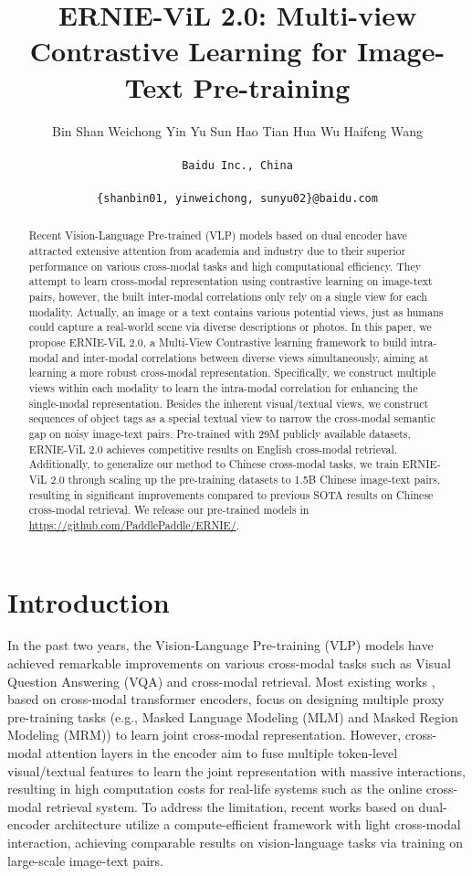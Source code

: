\documentclass{article}
\title{ERNIE-ViL 2.0: Multi-view Contrastive Learning for Image-Text Pre-training}
\author{
     Bin Shan
\hspace{1cm} Weichong Yin
\hspace{1cm} Yu Sun 
\hspace{1cm} Hao Tian  
\hspace{1cm} Hua Wu
\hspace{1cm} Haifeng Wang
\\\\\texttt{Baidu Inc., China}
\\\\
\texttt{\{shanbin01, yinweichong, sunyu02\}@baidu.com} 
}
\begin{document}
\maketitle
\begin{abstract}
Recent Vision-Language Pre-trained (VLP) models based on dual encoder have attracted extensive attention from academia and industry due to their superior performance on various cross-modal tasks and high computational efficiency. They attempt to learn cross-modal representation using contrastive learning on image-text pairs, however, the built inter-modal correlations only rely on a single view for each modality.
Actually, an image or a text contains various potential views, just as humans could capture a real-world scene via diverse descriptions or photos. In this paper, we propose ERNIE-ViL 2.0, a Multi-View Contrastive learning framework to build intra-modal and inter-modal correlations between diverse views simultaneously, aiming at learning a more robust cross-modal representation.
Specifically, we construct multiple views within each modality to learn the intra-modal correlation for enhancing the single-modal representation. Besides the inherent visual/textual views, we construct sequences of object tags as a special textual view to narrow the cross-modal semantic gap on noisy image-text pairs. 
Pre-trained with 29M publicly available datasets, ERNIE-ViL 2.0 achieves competitive results on English cross-modal retrieval. Additionally, to generalize our method to Chinese cross-modal tasks, we train ERNIE-ViL 2.0 through scaling up the pre-training datasets to 1.5B Chinese image-text pairs, resulting in significant improvements compared to previous SOTA results on Chinese cross-modal retrieval. We release our pre-trained models in \url{https://github.com/PaddlePaddle/ERNIE/}.
\end{abstract}


\section{Introduction}
\label{sec: Introduction}

In the past two years, the Vision-Language Pre-training (VLP) models have achieved remarkable improvements on various cross-modal tasks such as Visual Question Answering (VQA) and cross-modal retrieval.
Most existing works \cite{li2020unicoder,chen2020uniter,Li2020OscarOA}, based on cross-modal transformer encoders, focus on designing multiple proxy pre-training tasks (e.g., Masked Language Modeling (MLM) and Masked Region Modeling (MRM)) to learn joint cross-modal representation. However, cross-modal attention layers in the encoder aim to fuse multiple token-level visual/textual features to learn the joint representation with massive interactions, resulting in high computation costs for real-life systems such as the online cross-modal retrieval system.
To address the limitation, recent works \cite{Radford2021LearningTV,Jia2021ScalingUV,DBLP:journals/corr/abs-2111-07783} based on dual-encoder architecture utilize a compute-efficient framework with light cross-modal interaction, achieving comparable results on vision-language tasks via training on large-scale image-text pairs. 
\end{document}

